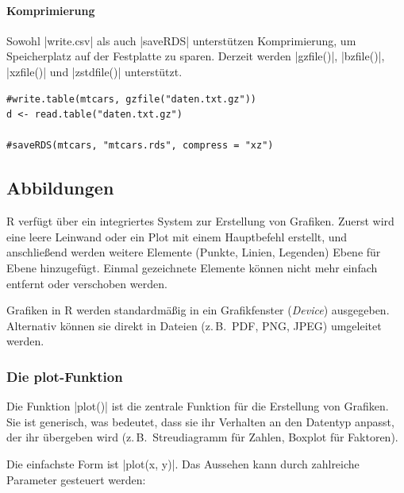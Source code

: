 \documentclass[10pt,twocolumn]{scrartcl}
\renewcommand{\lstinline}{\mycoloredinline}
\begin{document}
\paragraph{Komprimierung}

Sowohl \lstinline|write.csv| als auch \lstinline|saveRDS| unterstützen Komprimierung, um Speicherplatz auf der Festplatte zu sparen.
Derzeit werden \lstinline|gzfile()|, \lstinline|bzfile()|, \lstinline|xzfile()| und \lstinline|zstdfile()| unterstützt.

\begin{lstlisting}
#write.table(mtcars, gzfile("daten.txt.gz"))
d <- read.table("daten.txt.gz")

#saveRDS(mtcars, "mtcars.rds", compress = "xz")
\end{lstlisting}


\subsection{Abbildungen}

R verfügt über ein integriertes System zur Erstellung von Grafiken. Zuerst wird eine leere Leinwand oder ein Plot mit einem Hauptbefehl erstellt, und anschließend werden weitere Elemente (Punkte, Linien, Legenden) Ebene für Ebene hinzugefügt. Einmal gezeichnete Elemente können nicht mehr einfach entfernt oder verschoben werden.

Grafiken in R werden standardmäßig in ein Grafikfenster (\emph{Device}) ausgegeben. Alternativ können sie direkt in Dateien (z.\,B.\ PDF, PNG, JPEG) umgeleitet werden.

\subsubsection{Die plot-Funktion}

Die Funktion \lstinline|plot()| ist die zentrale Funktion für die Erstellung von Grafiken. Sie ist generisch, was bedeutet, dass sie ihr Verhalten an den Datentyp anpasst, der ihr übergeben wird (z.\,B.\ Streudiagramm für Zahlen, Boxplot für Faktoren).

Die einfachste Form ist \lstinline|plot(x, y)|. Das Aussehen kann durch zahlreiche Parameter gesteuert werden:
\end{document}
